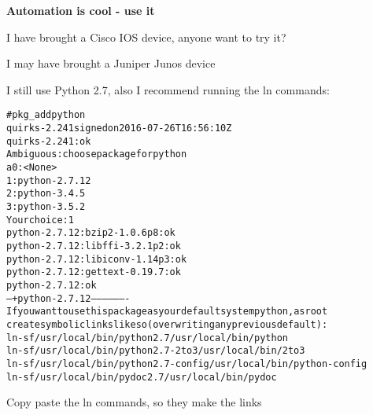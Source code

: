 \documentclass[18pt,landscape,a4paper,footrule]{foils}
\begin{document}

\begin{center}
\vskip 5mm
{\color{titlecolor}\LARGE \bf Automation is cool - use it}
\vskip 5mm

\end{center}



I have brought a Cisco IOS device, anyone want to try it?\\

I may have brought a Juniper Junos device\\


I still use Python 2.7, also I recommend running the ln commands:
\begin{alltt}\footnotesize
# pkg_add python
quirks-2.241 signed on 2016-07-26T16:56:10Z
quirks-2.241: ok
Ambiguous: choose package for python
a       0: <None>
        1: python-2.7.12
        2: python-3.4.5
        3: python-3.5.2
Your choice: 1
python-2.7.12:bzip2-1.0.6p8: ok
python-2.7.12:libffi-3.2.1p2: ok
python-2.7.12:libiconv-1.14p3: ok
python-2.7.12:gettext-0.19.7: ok
python-2.7.12: ok
--- +python-2.7.12 -------------------
If you want to use this package as your default system python, as root
create symbolic links like so (overwriting any previous default):
 ln -sf /usr/local/bin/python2.7 /usr/local/bin/python
 ln -sf /usr/local/bin/python2.7-2to3 /usr/local/bin/2to3
 ln -sf /usr/local/bin/python2.7-config /usr/local/bin/python-config
 ln -sf /usr/local/bin/pydoc2.7  /usr/local/bin/pydoc
\end{alltt}

Copy paste the ln commands, so they make the links
\end{document}
